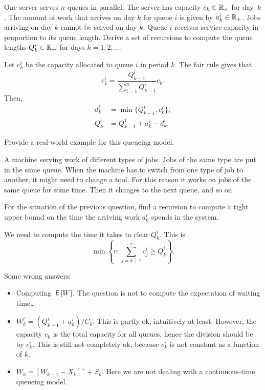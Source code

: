 \begin{exercise}[201704] 
One server serves $n$ queues in parallel. The
  server has capacity $c_k\in \mathbb{R}_+$ for day~$k$.  The amount of work
  that arrives on day $k$ for queue $i$ is given by $a_k^i\in \mathbb{R}_+$.
  Jobs arriving on day $k$ cannot be served on day $k$. Queue $i$
  receives service capacity in proportion to its queue length.  Derive
  a set of recursions  to compute the queue lengths $Q_k^i \in \mathbb{R}_+$ for days $k=1,2,\ldots$. 
\begin{solution}
    Let $c_k^i$ be the capacity allocated to queue $i$ in period $k$. The fair rule gives that 
    \begin{equation*}
      c_k^i = \frac{Q_{k-1}^i}{\sum_{i=1}^n Q_{k-1}^i } c_k.
    \end{equation*}
Then, 
\begin{equation*}
  \begin{split}
      d_k^i &= \min\{Q_{k-1}^i, c^i_k\}, \\
Q_k^i &= Q_{k-1}^1+a_k^i  - d_k^i.
  \end{split}
\end{equation*}
\end{solution}
  \end{exercise}

\begin{exercise}[201704]
  Provide a real-world example for this queueing model.
\begin{solution}
A machine serving work of different types of jobs. Jobs of the same type are put in the same queue. When the machine has to switch from one type of job to another, it might need to change a tool. For this reason it works on jobs of the same queue for some time. Then it changes to the next queue, and so on. 
\end{solution}
\end{exercise}

\begin{exercise}[201704]
For the situation of the previous question, find a recursion to compute a tight upper bound on the time the arriving work $a_k^i$ spends in the system.
\begin{solution}
We need to compute the time it takes to clear $Q_k^i$. This is
\begin{equation*}
  \min\left\{r: \sum_{j=k+1}^r c_j^i \geq Q_k^i\right\}.
\end{equation*}

Some wrong answers:
\begin{itemize}
\item Computing $\,\mathsf{E}\left[W\right]$. The question is not to compute the expectation of waiting time\ldots
\item $W_k^i=(Q_{k-1}^i+a_k^i)/C_k$. This is partly ok, intuitively at least. However, the capacity $c_k$ is the total capacity for all queues, hence the division should be by $c_k^i$. This is still not completely ok, because $c_k^i$ is not constant as a function of $k$.
\item $W_k = [W_{k-1}-X_k]^+ + S_k$. Here we are not dealing with a continuous-time queueing model. 
\end{itemize}
\end{solution}
\end{exercise}


